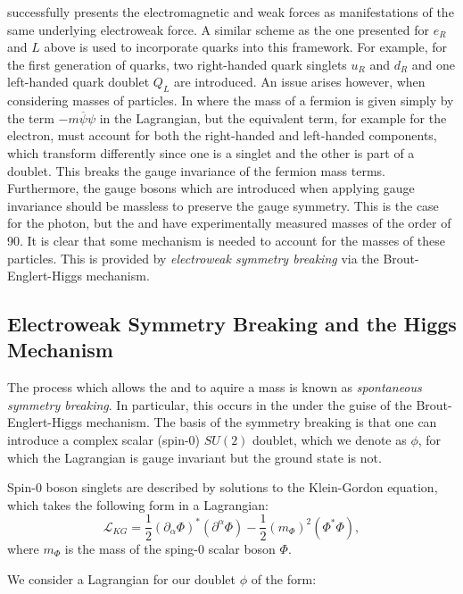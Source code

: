 \EWT successfully presents the electromagnetic and weak forces as manifestations of the same underlying electroweak force. A similar scheme as the one presented for $e_{R}$ and $L$ above is used to incorporate quarks into this framework. For example, for the first generation of quarks, two right-handed quark singlets $u_{R}$ and $d_{R}$ and one left-handed quark doublet $Q_{L}$ are introduced. An issue arises however, when considering masses of particles. In \QED where the mass of a fermion is given simply by the term $ -m\overline{\psi}\psi$ in the Lagrangian, but the equivalent term, for example for the electron, must account for both the right-handed and left-handed components, which transform differently since one is a singlet and the other is part of a doublet. This breaks the gauge invariance of the fermion mass terms. Furthermore, the gauge bosons which are introduced when applying gauge invariance should be massless to preserve the gauge symmetry. This is the case for the photon, but the \PWpm and \PZzero have experimentally measured masses of the order of 90\GeV. It is clear that some mechanism is needed to account for the masses of these particles. This is provided by \emph{electroweak symmetry breaking} via the Brout-Englert-Higgs mechanism.

\subsection{Electroweak Symmetry Breaking and the Higgs Mechanism}
\label{sec:th:ewsb}

The process which allows the \PWpm and \PZzero to aquire a mass is known as \emph{spontaneous symmetry breaking}. In particular, this occurs in the \SM under the guise of the Brout-Englert-Higgs mechanism. The basis of the symmetry breaking is that one can introduce a complex scalar (spin-0) $SU(2)$ doublet, which we denote as $\phi$, for which the Lagrangian is gauge invariant but the ground state is not. 

Spin-0 boson singlets are described by solutions to the Klein-Gordon equation, which takes the following form in a Lagrangian:
\begin{equation}
\label{eq:th:klein_gordon_lagrangian}
\mathcal{L}_{KG} = \frac{1}{2}(\partial_{\alpha} \Phi)^{*} (\partial^{\alpha} \Phi) - \frac{1}{2} (m_{\Phi})^{2} (\Phi^{*} \Phi)  ,
\end{equation}
where $m_{\Phi}$ is the mass of the sping-0 scalar boson $\Phi$.

We consider a Lagrangian for our doublet $\phi$ of the form:

